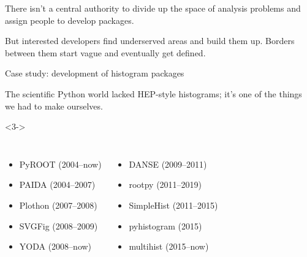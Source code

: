 \documentclass[aspectratio=169]{beamer}
\begin{document}
\begin{frame}{}
\vspace{1 cm}
\Large

\begin{center}
There isn't a central authority to divide up the space of analysis problems and assign people to develop packages.

\vspace{1 cm}
But interested developers find underserved areas and build them up. Borders between them start vague and eventually get defined.
\end{center}
\end{frame}

\begin{frame}{Case study: development of histogram packages}
\large
\vspace{0.5 cm}

The scientific Python world lacked HEP-style histograms; it's one of the things we had to make ourselves.

\vspace{0.5 cm}

\vspace{0.5 cm}

\vspace{0.5 cm}
\begin{uncoverenv}<3->
\begin{columns}
\scriptsize
{}
\begin{itemize}
\item PyROOT (2004--now)
\item PAIDA (2004--2007)
\item Plothon (2007--2008)
\item SVGFig (2008--2009)
\item YODA (2008--now)
\end{itemize}

\begin{itemize}
\item DANSE (2009--2011)
\item rootpy (2011--2019)
\item SimpleHist (2011--2015)
\item pyhistogram (2015)
\item multihist (2015--now)
\end{itemize}


\end{columns}
\end{uncoverenv}
\end{frame}
\end{document}
